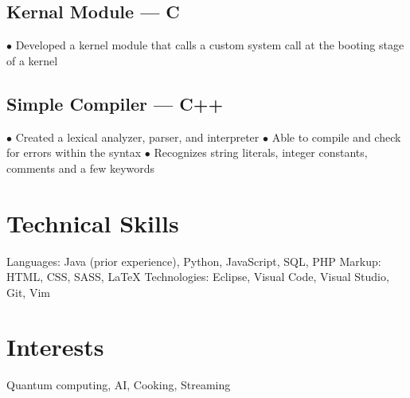 \documentclass{article}
\newcommand\bulletpts{$\bullet$}
\newcommand\bulletspace{\hspace*{.5em}}
\begin{document}
\subsection{Kernal Module --- C \hfill{}}
\bulletspace\bulletpts{} Developed a kernel module that calls a custom system call at the booting stage of a kernel
\subsection{Simple Compiler --- C++ \hfill{}}
\bulletspace\bulletpts{} Created a lexical analyzer, parser, and interpreter \newline 
\bulletspace\bulletpts{} Able to compile and check for errors within the syntax \newline
\bulletspace\bulletpts{} Recognizes string literals, integer constants, comments and a few keywords

\section{Technical Skills}
Languages: Java (prior experience), Python, JavaScript, SQL, PHP \newline
Markup: HTML, CSS, SASS, {\LaTeX} \newline
Technologies: Eclipse, Visual Code, Visual Studio, Git, Vim

\section{Interests}
Quantum computing, AI, Cooking, Streaming
\end{document}
